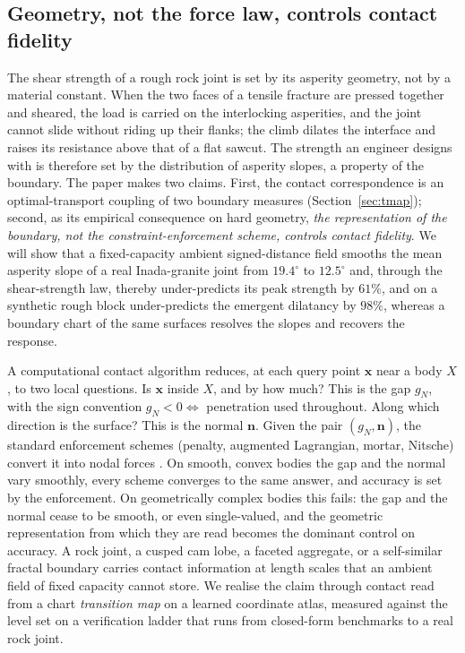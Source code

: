 \documentclass{svjour3}                 %
\newcommand{\nbf}{\bm{n}}
\newcommand{\xbf}{\bm{x}}
\newcommand{\gn}{g_{\scriptscriptstyle N}}
\begin{document}
\subsection{Geometry, not the force law, controls contact fidelity}\label{sec:intro-motivation}

The shear strength of a rough rock joint is set by its asperity geometry, not by a material constant. When the two faces of a tensile
fracture are pressed together and sheared, the load is carried on the interlocking asperities, and the
joint cannot slide without riding up their flanks; the climb dilates the interface and raises its
resistance above that of a flat sawcut. The strength an engineer designs with is therefore set by the
distribution of asperity slopes, a property of the boundary. The paper makes two
claims. First, the contact correspondence is an optimal-transport coupling of two boundary measures
(Section~\ref{sec:tmap}); second, as its empirical consequence on hard geometry, \emph{the representation of the
boundary, not the constraint-enforcement scheme, controls contact fidelity}. We will
show that a fixed-capacity ambient signed-distance field smooths the mean asperity slope of a real
Inada-granite joint from $19.4^\circ$ to $12.5^\circ$ and, through the shear-strength law, thereby under-predicts
its peak strength by $61\%$, and on a synthetic rough block under-predicts the emergent dilatancy by $98\%$,
whereas a boundary chart of the same surfaces resolves the slopes and recovers the response.

A computational contact algorithm reduces, at each query point $\xbf$ near a body $X$, to two local
questions. Is $\xbf$ inside $X$, and by how much? This is the gap $\gn$, with the sign convention
$\gn<0\Leftrightarrow$ penetration used throughout. Along which direction is the surface? This is the
normal $\nbf$. Given the pair $(\gn,\nbf)$, the standard enforcement schemes (penalty,
augmented Lagrangian, mortar, Nitsche) convert it into nodal forces \citep{wriggers2006computational,
laursen2002computational,kikuchi1988contact}. On smooth, convex bodies the gap and the normal vary smoothly, every scheme converges to the
same answer, and accuracy is set by the enforcement. On geometrically complex bodies this fails: the gap and the normal
cease to be smooth, or even single-valued, and the geometric representation from which they are read becomes
the dominant control on accuracy. A rock joint, a cusped cam lobe, a faceted aggregate, or a self-similar
fractal boundary carries contact information at length scales that an ambient field of fixed capacity cannot
store. We realise the claim through contact read from a chart \emph{transition map} on a learned coordinate
atlas, measured against the level set on a verification ladder that runs from closed-form benchmarks to a real
rock joint.
\end{document}
